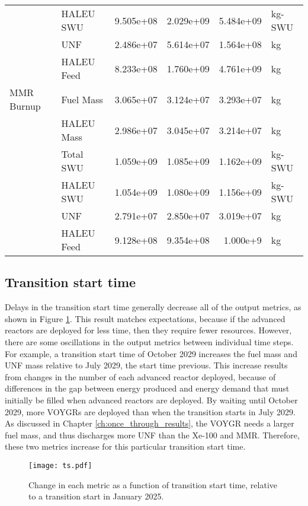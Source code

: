 \begin{table}[ht!]
\begin{tabular}{llrrrl}
                      &  HALEU SWU & 9.505e+08 & 2.029e+09 & 5.484e+09 & kg-SWU\\
                      &        UNF & 2.486e+07 & 5.614e+07 & 1.564e+08 & kg\\
                      & HALEU Feed & 8.233e+08 & 1.760e+09 & 4.761e+09 & kg\\\hline 
        MMR Burnup &  Fuel Mass & 3.065e+07 & 3.124e+07 & 3.293e+07 & kg\\
                   & HALEU Mass & 2.986e+07 & 3.045e+07 & 3.214e+07 & kg\\
                   &  Total SWU & 1.059e+09 & 1.085e+09 & 1.162e+09 & kg-SWU\\
                   &  HALEU SWU & 1.054e+09 & 1.080e+09 & 1.156e+09 & kg-SWU\\
                   &        UNF & 2.791e+07 & 2.850e+07 & 3.019e+07 & kg\\
                   & HALEU Feed & 9.128e+08 & 9.354e+08 & 1.000e+9 & kg\\
        \hline
    \end{tabular}
\end{table}


\subsection{Transition start time}
Delays in the transition start time generally decrease all of the output 
metrics, as shown in Figure \ref{fig:ts_scenario7}. This result matches 
expectations, because if the advanced reactors are deployed for less time, 
then they require fewer resources. However, there are some oscillations in 
the output metrics between individual time steps. For example, a transition 
start time of October 2029 increases the fuel mass and \gls{UNF} mass 
relative to July 2029, the start time previous. This increase results 
from changes in the number 
of each advanced reactor deployed, because of differences in the gap 
between energy produced and energy demand that must initially be filled when 
advanced reactors are deployed. By waiting until October 2029, more VOYGRs 
are deployed than when the transition starts in July 2029. As discussed in 
Chapter \ref{ch:once_through_results}, the VOYGR needs a larger fuel mass, 
and thus discharges more \gls{UNF} than the Xe-100 and \gls{MMR}. Therefore, 
these two metrics increase for this particular transition start time. 

\begin{figure}[h!]
    \centering
    \texttt{[image: ts.pdf]}
    \caption{Change in each metric as a function of transition start 
    time, relative to a transition start in January 2025.}
    \label{fig:ts_scenario7}
\end{figure}

